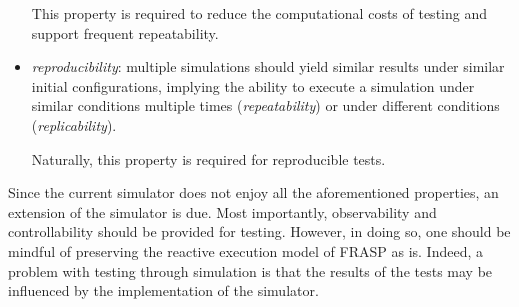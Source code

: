 \begin{itemize}
        This property is required to reduce the computational costs of testing
        and support frequent repeatability.
  \item \textit{reproducibility}: multiple simulations should yield similar
        results under similar initial configurations, implying the ability to
        execute a simulation under similar conditions multiple times
        (\textit{repeatability}) or under different conditions
        (\textit{replicability}).

        Naturally, this property is required for reproducible tests.
\end{itemize}

Since the current simulator does not enjoy all the aforementioned properties,
an extension of the simulator is due. Most importantly, observability and
controllability should be provided for testing. However, in doing so, one
should be mindful of preserving the reactive execution model of FRASP as is.
Indeed, a problem with testing through simulation is that the results of the
tests may be influenced by the implementation of the simulator.
